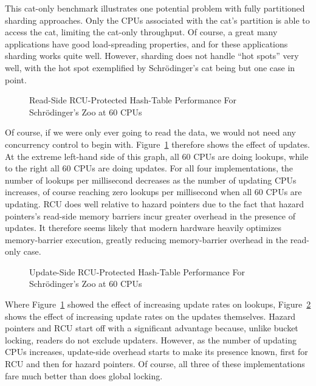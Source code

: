 This cat-only benchmark illustrates one potential problem with
fully partitioned sharding approaches.
Only the CPUs associated with the cat's
partition is able to access the cat, limiting the cat-only
throughput.
Of course, a great many applications have good load-spreading
properties, and for these applications sharding works
quite well.
However, sharding does not handle ``hot spots'' very well, with
the hot spot exemplified by Schr\"odinger's cat being but one case
in point.

\begin{figure}[tb]
\centering
{}
\caption{Read-Side RCU-Protected Hash-Table Performance For Schr\"odinger's Zoo at 60 CPUs}
\label{fig:datastruct:Read-Side RCU-Protected Hash-Table Performance For Schroedinger's Zoo at 60 CPUs}
\end{figure}

Of course, if we were only ever going to read the data, we would not need
any concurrency control to begin with.
Figure~\ref{fig:datastruct:Read-Side RCU-Protected Hash-Table Performance For Schroedinger's Zoo at 60 CPUs}
therefore shows the effect of updates.
At the extreme left-hand side of this graph, all 60 CPUs are doing lookups,
while to the right all 60 CPUs are doing updates.
For all four implementations, the number of lookups per millisecond
decreases as the number of updating CPUs increases, of course reaching
zero lookups per millisecond when all 60 CPUs are updating.
RCU does well relative to hazard pointers due to the fact that hazard
pointers's read-side memory barriers incur greater overhead in the
presence of updates.
It therefore seems likely that modern hardware heavily optimizes memory-barrier
execution, greatly reducing memory-barrier overhead in the read-only case.

\begin{figure}[tb]
\centering
{}
\caption{Update-Side RCU-Protected Hash-Table Performance For Schr\"odinger's Zoo at 60 CPUs}
\label{fig:datastruct:Update-Side RCU-Protected Hash-Table Performance For Schroedinger's Zoo at 60 CPUs}
\end{figure}

Where
Figure~\ref{fig:datastruct:Read-Side RCU-Protected Hash-Table Performance For Schroedinger's Zoo at 60 CPUs}
showed the effect of increasing update rates on lookups,
Figure~\ref{fig:datastruct:Update-Side RCU-Protected Hash-Table Performance For Schroedinger's Zoo at 60 CPUs}
shows the effect of increasing update rates on the updates themselves.
Hazard pointers and RCU start off with a significant advantage because,
unlike bucket locking, readers do not exclude updaters.
However, as the number of updating CPUs increases, update-side overhead
starts to make its presence known, first for RCU and then for hazard
pointers.
Of course, all three of these implementations fare much better than does
global locking.

